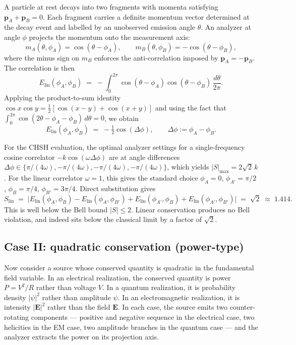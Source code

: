\documentclass[
  11pt]{article}
\begin{document}
A particle at rest decays into two fragments with momenta satisfying
\(\mathbf{p}_A + \mathbf{p}_B = 0\). Each fragment carries a definite
momentum vector determined at the decay event and labelled by an
unobserved emission angle \(\theta\). An analyzer at angle \(\phi\)
projects the momentum onto the measurement axis: \[
m_A(\theta, \phi_A) = \cos(\theta - \phi_A), \qquad m_B(\theta, \phi_B) = -\cos(\theta - \phi_B),
\] where the minus sign on \(m_B\) enforces the anti-correlation imposed
by \(\mathbf{p}_A = -\mathbf{p}_B\). The correlation is then \[
E_\text{lin}(\phi_A, \phi_B) \;=\; -\int_0^{2\pi} \cos(\theta - \phi_A)\cos(\theta - \phi_B)\, \frac{d\theta}{2\pi}.
\] Applying the product-to-sum identity
\(\cos x \cos y = \tfrac{1}{2}[\cos(x-y) + \cos(x+y)]\) and using the
fact that
\(\int_0^{2\pi} \cos(2\theta - \phi_A - \phi_B)\, d\theta = 0\), we
obtain \[
E_\text{lin}(\phi_A, \phi_B) \;=\; -\tfrac{1}{2}\cos(\Delta\phi), \qquad \Delta\phi := \phi_A - \phi_B.
\]

For the CHSH evaluation, the optimal analyzer settings for a
single-frequency cosine correlator \(-k\cos(\omega\Delta\phi)\) are at
angle differences
\(\Delta\phi \in \{\pi/(4\omega), -\pi/(4\omega), -\pi/(4\omega), -\pi/(4\omega)\}\),
which yields \(|S|_{\max} = 2\sqrt{2}\, k\). For the linear correlator
\(\omega = 1\), this gives the standard choice \(\phi_A = 0\),
\(\phi_{A'} = \pi/2\), \(\phi_B = \pi/4\), \(\phi_{B'} = 3\pi/4\).
Direct substitution gives \[
S_\text{lin} \;=\; \big| E_\text{lin}(\phi_A, \phi_B) - E_\text{lin}(\phi_A, \phi_{B'}) + E_\text{lin}(\phi_{A'}, \phi_B) + E_\text{lin}(\phi_{A'}, \phi_{B'}) \big| \;=\; \sqrt{2} \;\approx\; 1.414.
\] This is well below the Bell bound \(|S| \leq 2\). Linear conservation
produces no Bell violation, and indeed sits below the classical limit by
a factor of \(\sqrt{2}\).

\subsection{Case II: quadratic conservation
(power-type)}\label{case-ii-quadratic-conservation-power-type}

Now consider a source whose conserved quantity is quadratic in the
fundamental field variable. In an electrical realization, the conserved
quantity is power \(P = V^2/R\) rather than voltage \(V\). In a quantum
realization, it is probability density \(|\psi|^2\) rather than
amplitude \(\psi\). In an electromagnetic realization, it is intensity
\(|\mathbf{E}|^2\) rather than the field \(\mathbf{E}\). In each case,
the source emits two counter-rotating components --- positive and
negative sequence in the electrical case, two helicities in the EM case,
two amplitude branches in the quantum case --- and the analyzer extracts
the power on its projection axis.
\end{document}
